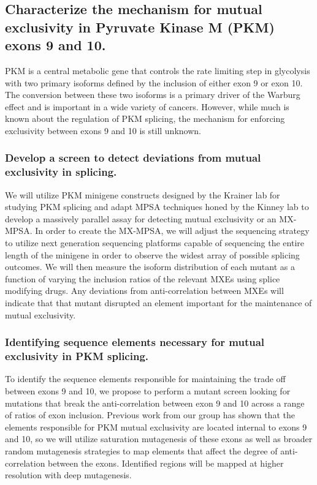 \documentclass{article}
\begin{document}
\subsection{Characterize the mechanism for mutual exclusivity in Pyruvate Kinase M (PKM) exons 9 and 10.}
PKM is a central metabolic gene that controls the rate limiting step in glycolysis with two primary isoforms defined by the inclusion of either exon 9 or exon 10. 
The conversion between these two isoforms is a primary driver of the Warburg effect and is important in a wide variety of cancers.\Cite{Christofk2008-bu,Ma2022-dt} 
However, while much is known about the regulation of PKM splicing, the mechanism for enforcing exclusivity between exons 9 and 10 is still unknown.
%
\subsubsection{Develop a screen to detect deviations from mutual exclusivity in splicing.} 
We will utilize PKM minigene constructs designed by the Krainer lab for studying PKM splicing \cite{Wang2012-dr} and adapt MPSA techniques honed by the Kinney lab \cite{Wong2018-vq,Ishigami2022-bf} to develop a massively parallel assay for detecting mutual exclusivity or an MX-MPSA.
In order to create the MX-MPSA, we will adjust the sequencing strategy to utilize next generation sequencing platforms capable of sequencing the entire length of the minigene in order to observe the widest array of possible splicing outcomes.
We will then measure the isoform distribution of each mutant as a function of varying the inclusion ratios of the relevant MXEs using splice modifying drugs. 
Any deviations from anti-correlation between MXEs will indicate that that mutant disrupted an element important for the maintenance of mutual exclusivity.
% 
\subsubsection{Identifying sequence elements necessary for mutual exclusivity in PKM splicing.} 
To identify the sequence elements responsible for maintaining the trade off between exons 9 and 10, we propose to perform a mutant screen looking for mutations that break the anti-correlation between exon 9 and 10 across a range of ratios of exon inclusion. 
Previous work from our group has shown that the elements responsible for PKM mutual exclusivity are located internal to exons 9 and 10, so we will utilize saturation mutagenesis of these exons as well as broader random mutagenesis strategies to map elements that affect the degree of anti-correlation between the exons. 
Identified regions will be mapped at higher resolution with deep mutagenesis.
%
\end{document}
